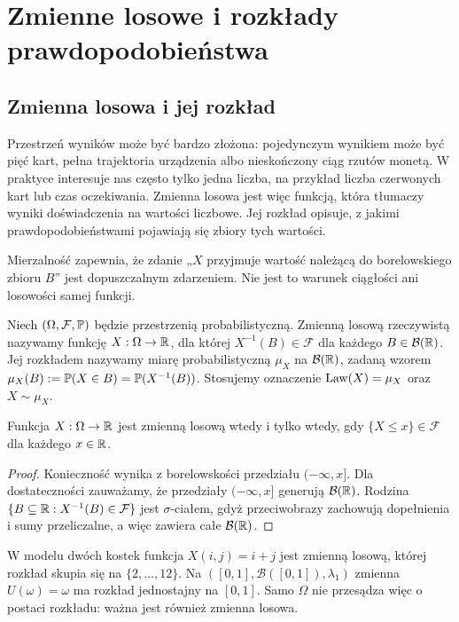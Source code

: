 \chapter{Zmienne losowe i rozkłady prawdopodobieństwa}
\label{ch:random-variables}

\section{Zmienna losowa i jej rozkład}
Przestrzeń wyników może być bardzo złożona: pojedynczym wynikiem
może być pięć kart, pełna trajektoria urządzenia albo nieskończony
ciąg rzutów monetą. W praktyce interesuje nas często tylko jedna
liczba, na przykład liczba czerwonych kart lub czas oczekiwania.
Zmienna losowa jest więc funkcją, która tłumaczy wyniki doświadczenia
na wartości liczbowe. Jej rozkład opisuje, z jakimi
prawdopodobieństwami pojawiają się zbiory tych wartości.

Mierzalność zapewnia, że zdanie „$X$ przyjmuje wartość należącą
do borelowskiego zbioru $B$” jest dopuszczalnym zdarzeniem.
Nie jest to warunek ciągłości ani losowości samej funkcji.

\begin{definicja}
Niech $(\Omega,\mathcal F,\mathbb{P})$ będzie przestrzenią probabilistyczną.
Zmienną losową rzeczywistą nazywamy funkcję
$X:\Omega\to\mathbb{R}$, dla której $X^{-1}(B)\in\mathcal F$
dla każdego $B\in\mathcal B(\mathbb{R})$. Jej rozkładem nazywamy miarę
probabilistyczną $\mu_X$ na $\mathcal B(\mathbb{R})$, zadaną wzorem
$\mu_X(B):=\mathbb{P}(X\in B)=\mathbb{P}(X^{-1}(B))$.
Stosujemy oznaczenie $\operatorname{Law}(X)=\mu_X$ oraz $X\sim\mu_X$.
\end{definicja}

\begin{stwierdzenie}
Funkcja $X:\Omega\to\mathbb{R}$ jest zmienną losową wtedy i tylko wtedy,
gdy $\{X\leq x\}\in\mathcal F$ dla każdego $x\in\mathbb{R}$.
\end{stwierdzenie}
\begin{proof}
Konieczność wynika z borelowskości przedziału $(-\infty,x]$.
Dla dostateczności zauważamy, że przedziały $(-\infty,x]$ generują
$\mathcal B(\mathbb{R})$. Rodzina $\{B\subseteq\mathbb{R}:X^{-1}(B)\in\mathcal F\}$
jest $\sigma$-ciałem, gdyż przeciwobrazy zachowują dopełnienia
i sumy przeliczalne, a więc zawiera całe $\mathcal B(\mathbb{R})$.
\end{proof}

\begin{przyklad}
W modelu dwóch kostek funkcja $X(i,j)=i+j$ jest zmienną losową,
której rozkład skupia się na $\{2,\ldots,12\}$.
Na $([0,1],\mathcal B([0,1]),\lambda_1)$ zmienna $U(\omega)=\omega$
ma rozkład jednostajny na $[0,1]$. Samo $\Omega$ nie przesądza więc
o postaci rozkładu: ważna jest również zmienna losowa.
\end{przyklad}

